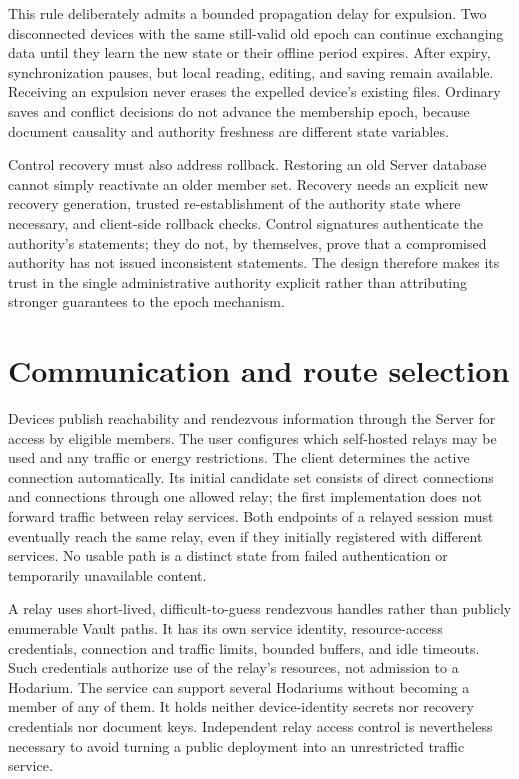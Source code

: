 \documentclass[11pt,a4paper]{article}
\theoremstyle{definition}
\theoremstyle{plain}
\begin{document}
This rule deliberately admits a bounded propagation delay for
expulsion. Two disconnected devices with the same still-valid old
epoch can continue exchanging data until they learn the new state or
their offline period expires. After expiry, synchronization pauses,
but local reading, editing, and saving remain available. Receiving an
expulsion never erases the expelled device's existing files. Ordinary
saves and conflict decisions do not advance the membership epoch,
because document causality and authority freshness are different
state variables.

Control recovery must also address rollback. Restoring an old Server
database cannot simply reactivate an older member set. Recovery needs
an explicit new recovery generation, trusted re-establishment of the
authority state where necessary, and client-side rollback checks.
Control signatures authenticate the authority's statements; they do
not, by themselves, prove that a compromised authority has not issued
inconsistent statements. The design therefore makes its trust in the
single administrative authority explicit rather than attributing
stronger guarantees to the epoch mechanism.

\section{Communication and route selection}
\label{sec:communication}

Devices publish reachability and rendezvous information through the
Server for access by eligible members. The user configures which
self-hosted relays may be used and any traffic or energy restrictions.
The client determines the active connection automatically. Its initial
candidate set consists of direct connections and connections through
one allowed relay; the first implementation does not forward traffic
between relay services. Both endpoints of a relayed session must
eventually reach the same relay, even if they initially registered
with different services. No usable path is a distinct state from
failed authentication or temporarily unavailable content.

A relay uses short-lived, difficult-to-guess rendezvous handles rather
than publicly enumerable Vault paths. It has its own service identity,
resource-access credentials, connection and traffic limits, bounded
buffers, and idle timeouts. Such credentials authorize use of the
relay's resources, not admission to a Hodarium. The service can support
several Hodariums without becoming a member of any of them. It holds
neither device-identity secrets nor recovery credentials nor document
keys. Independent relay access control is nevertheless necessary to
avoid turning a public deployment into an unrestricted traffic service.
\end{document}
